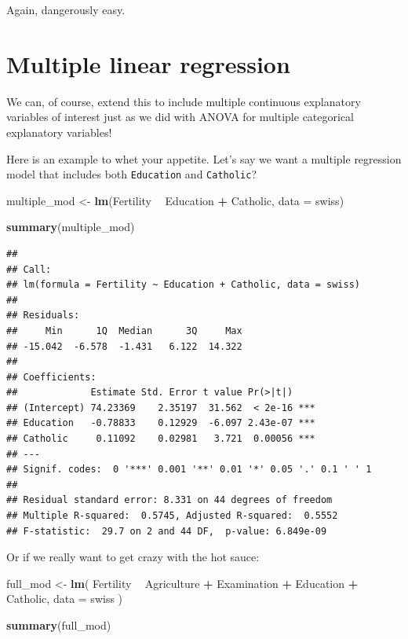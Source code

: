 \documentclass[
]{book}
\newenvironment{Shaded}{\begin{snugshade}}{\end{snugshade}}
\newcommand{\DataTypeTok}[1]{\textcolor[rgb]{0.13,0.29,0.53}{#1}}
\newcommand{\KeywordTok}[1]{\textcolor[rgb]{0.13,0.29,0.53}{\textbf{#1}}}
\newcommand{\NormalTok}[1]{#1}
\newcommand{\OperatorTok}[1]{\textcolor[rgb]{0.81,0.36,0.00}{\textbf{#1}}}
\newcommand{\StringTok}[1]{\textcolor[rgb]{0.31,0.60,0.02}{#1}}
\begin{document}
Again, dangerously easy.

\hypertarget{multiple-linear-regression}{%
\section{Multiple linear regression}\label{multiple-linear-regression}}

We can, of course, extend this to include multiple continuous explanatory variables of interest just as we did with ANOVA for multiple categorical explanatory variables!

Here is an example to whet your appetite. Let's say we want a multiple regression model that includes both \texttt{Education} and \texttt{Catholic}?

\begin{Shaded}
\begin{Highlighting}[]
\NormalTok{multiple_mod <-}\StringTok{ }\KeywordTok{lm}\NormalTok{(Fertility }\OperatorTok{~}\StringTok{ }\NormalTok{Education }\OperatorTok{+}\StringTok{ }\NormalTok{Catholic, }\DataTypeTok{data =}\NormalTok{ swiss)}

\KeywordTok{summary}\NormalTok{(multiple_mod)}
\end{Highlighting}
\end{Shaded}

\begin{verbatim}
## 
## Call:
## lm(formula = Fertility ~ Education + Catholic, data = swiss)
## 
## Residuals:
##     Min      1Q  Median      3Q     Max 
## -15.042  -6.578  -1.431   6.122  14.322 
## 
## Coefficients:
##             Estimate Std. Error t value Pr(>|t|)    
## (Intercept) 74.23369    2.35197  31.562  < 2e-16 ***
## Education   -0.78833    0.12929  -6.097 2.43e-07 ***
## Catholic     0.11092    0.02981   3.721  0.00056 ***
## ---
## Signif. codes:  0 '***' 0.001 '**' 0.01 '*' 0.05 '.' 0.1 ' ' 1
## 
## Residual standard error: 8.331 on 44 degrees of freedom
## Multiple R-squared:  0.5745,	Adjusted R-squared:  0.5552 
## F-statistic:  29.7 on 2 and 44 DF,  p-value: 6.849e-09
\end{verbatim}

Or if we really want to get crazy with the hot sauce:

\begin{Shaded}
\begin{Highlighting}[]
\NormalTok{full_mod <-}\StringTok{ }\KeywordTok{lm}\NormalTok{(}
\NormalTok{  Fertility }\OperatorTok{~}\StringTok{ }\NormalTok{Agriculture }\OperatorTok{+}\StringTok{ }\NormalTok{Examination }\OperatorTok{+}\StringTok{ }\NormalTok{Education }\OperatorTok{+}\StringTok{ }\NormalTok{Catholic,}
  \DataTypeTok{data =}\NormalTok{ swiss}
\NormalTok{  )}

\KeywordTok{summary}\NormalTok{(full_mod)}
\end{Highlighting}
\end{Shaded}
\end{document}
